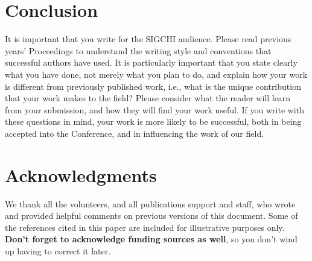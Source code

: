 \documentclass{sigchi}
\begin{document}
\section{Conclusion}

It is important that you write for the SIGCHI audience.  Please read
previous years' Proceedings to understand the writing style and
conventions that successful authors have used.  It is particularly
important that you state clearly what you have done, not merely what
you plan to do, and explain how your work is different from previously
published work, i.e., what is the unique contribution that your work
makes to the field?  Please consider what the reader will learn from
your submission, and how they will find your work useful.  If you
write with these questions in mind, your work is more likely to be
successful, both in being accepted into the Conference, and in
influencing the work of our field.

\section{Acknowledgments}

We thank all the volunteers, and all publications support
and staff, who wrote and provided helpful comments on previous
versions of this document.  Some of the references cited in this paper
are included for illustrative purposes only.  \textbf{Don't forget
to acknowledge funding sources as well}, so you don't wind up
having to correct it later.

%
%
%
%
%
\balance



\end{document}
